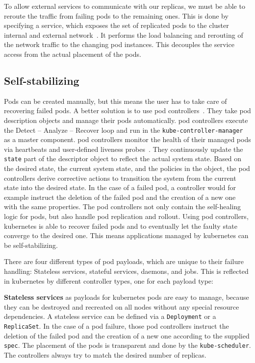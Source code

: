   To allow external services to communicate with our replicas, we must be able to reroute the traffic from failing pods to the remaining ones.
  This is done by specifying a \gls{service}, which exposes the set of replicated pods to the cluster internal and external network~\cite{kubernetesdoc}.
  It performs the load balancing and rerouting of the network traffic to the changing pod instances.
  This decouples the service access from the actual placement of the pods.

\subsection{Self-stabilizing}\label{sec:self-healing-kubernetes:self-stabilizing}
  Pods can be created manually, but this means the user has to take care of recovering failed pods.
  A better solution is to use \glspl{pod controller}~\cite{kubernetesdoc}.
  They take pod description objects and manage their pods automatically.
  \Glspl{pod controller} execute the Detect -- Analyze -- Recover loop and run in the \texttt{kube-controller-manager} as a master component.
  \Glspl{pod controller} monitor the health of their managed pods via heartbeats and user-defined liveness probes~\cite{kubernetesdoc}.
  They continuously update the \texttt{state} part of the descriptor object to reflect the actual system state.
  Based on the desired state, the current system state, and the policies in the object, the \glspl{pod controller} derive corrective actions to transition the system from the current state into the desired state.
  In the case of a failed pod, a controller would for example instruct the deletion of the failed pod and the creation of a new one with the same properties.
  The \glspl{pod controller} not only contain the self-healing logic for pods, but also handle pod replication and rollout.
  Using \glspl{pod controller}, \gls{kubernetes} is able to recover failed pods and to eventually let the faulty state converge to the desired one.
  This means applications managed by \gls{kubernetes} can be self-stabilizing.

  There are four different types of pod payloads, which are unique to their failure handling:
  Stateless services, stateful services, daemons, and jobs.
  This is reflected in \gls{kubernetes} by different controller types, one for each payload type:

  \textbf{Stateless services} as payloads for \gls{kubernetes} pods are easy to manage, because they can be destroyed and recreated on all nodes without any special resource dependencies.
  A stateless service can be defined via a \texttt{Deployment} or a \texttt{ReplicaSet}.
  In the case of a pod failure, those \glspl{pod controller} instruct the deletion of the failed pod and the creation of a new one according to the supplied \texttt{spec}.
  The placement of the pods is transparent and done by the \texttt{kube-scheduler}.
  The controllers always try to match the desired number of replicas.

